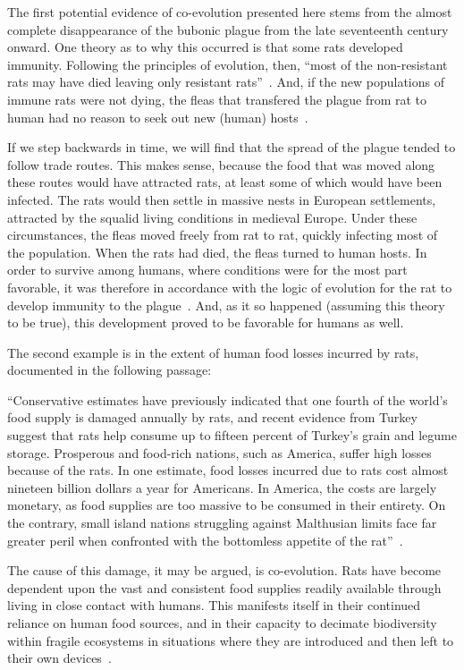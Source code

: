 \documentclass[12pt]{article}
\begin{document}
The first potential evidence of co-evolution presented here stems from the almost complete disappearance of the bubonic plague from the late seventeenth century onward. One theory as to why this occurred is that some rats developed immunity. Following the principles of evolution, then, ``most of the non-resistant rats may have died leaving only resistant rats''~\cite{ONeill}. And, if the new populations of immune rats were not dying, the fleas that transfered the plague from rat to human had no reason to seek out new (human) hosts~\cite{ONeill}.

If we step backwards in time, we will find that the spread of the plague tended to follow trade routes. This makes sense, because the food that was moved along these routes would have attracted rats, at least some of which would have been infected. The rats would then settle in massive nests in European settlements, attracted by the squalid living conditions in medieval Europe. Under these circumstances, the fleas moved freely from rat to rat, quickly infecting most of the population. When the rats had died, the fleas turned to human hosts. In order to survive among humans, where conditions were for the most part favorable, it was therefore in accordance with the logic of evolution for the rat to develop immunity to the plague~\cite{ONeill}. And, as it so happened (assuming this theory to be true), this development proved to be favorable for humans as well.

The second example is in the extent of human food losses incurred by rats, documented in the following passage:

``Conservative estimates have previously indicated that one fourth of the world’s food supply is damaged annually by rats, and recent evidence from Turkey suggest that rats help consume up to fifteen percent of Turkey’s grain and legume storage. Prosperous and food-rich nations, such as America, suffer high losses because of the rats. In one estimate, food losses incurred due to rats cost almost nineteen billion dollars a year for Americans. In America, the costs are largely monetary, as food supplies are too massive to be consumed in their entirety. On the contrary, small island nations struggling against Malthusian limits face far greater peril when confronted with the bottomless appetite of the rat''~\cite{ONeill}.

The cause of this damage, it may be argued, is co-evolution. Rats have become dependent upon the vast and consistent food supplies readily available through living in close contact with humans. This manifests itself in their continued reliance on human food sources, and in their capacity to decimate biodiversity within fragile ecosystems in situations where they are introduced and then left to their own devices~\cite{ONeill}.
\end{document}
